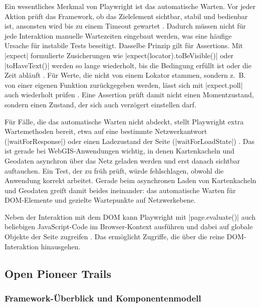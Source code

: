 Ein wesentliches Merkmal von Playwright ist das automatische Warten. Vor jeder Aktion prüft das Framework, ob das Zielelement sichtbar, stabil und bedienbar ist, ansonsten wird bis zu einem Timeout gewartet \parencite[Auto-waiting]{microsoft_auto-waiting_nodate}. Dadurch müssen nicht für jede Interaktion manuelle Wartezeiten eingebaut werden, was eine häufige Ursache für instabile Tests beseitigt. Dasselbe Prinzip gilt für Assertions. Mit \code|expect| formulierte Zusicherungen wie \code|expect(locator).toBeVisible()| oder \code|toHaveText()| werden so lange wiederholt, bis die Bedingung erfüllt ist oder die Zeit abläuft \parencite[Assertions]{microsoft_assertions_nodate}. Für Werte, die nicht von einem Lokator stammen, sondern z.~B. von einer eigenen Funktion zurückgegeben werden, lässt sich mit \code|expect.poll| auch wiederholt prüfen \parencite[expect.poll]{microsoft_assertions_nodate}. Eine Assertion prüft damit nicht einen Momentzustand, sondern einen Zustand, der sich auch verzögert einstellen darf.

Für Fälle, die das automatische Warten nicht abdeckt, stellt Playwright extra Wartemethoden bereit, etwa auf eine bestimmte Netzwerkantwort (\code|waitForResponse|) oder einen Ladezustand der Seite (\code|waitForLoadState|) \parencite[Page]{microsoft_page_nodate}. Das ist gerade bei WebGIS-Anwendungen wichtig, in denen Kartenkacheln und Geodaten asynchron über das Netz geladen werden und erst danach sichtbar auftauchen. Ein Test, der zu früh prüft, würde fehlschlagen, obwohl die Anwendung korrekt arbeitet. Gerade beim asynchronen Laden von Kartenkacheln und Geodaten greift damit beides ineinander: das automatische Warten für \ac{DOM}-Elemente und gezielte Wartepunkte auf Netzwerkebene.

Neben der Interaktion mit dem \ac{DOM} kann Playwright mit \code|page.evaluate()| auch beliebigen JavaScript-Code im Browser-Kontext ausführen und dabei auf globale Objekte der Seite zugreifen \parencite[Evaluating JavaScript]{microsoft_evaluating_nodate}. Das ermöglicht Zugriffe, die über die reine \ac{DOM}-Interaktion hinausgehen.

\subsection{Open Pioneer Trails}

\subsubsection{Framework-Überblick und Komponentenmodell}


